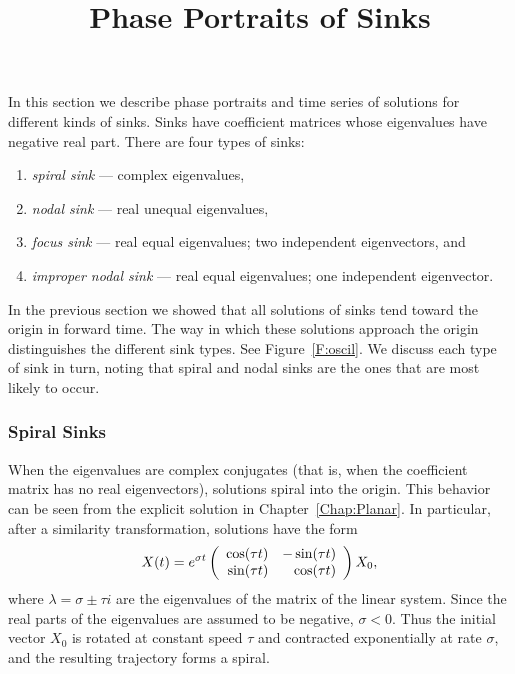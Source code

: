 \documentclass{ximera}
\title{Phase Portraits of Sinks}
\begin{document}
\begin{abstract}
\end{abstract}
\maketitle

  \label{S:PlanarSystems}

In this section we describe phase portraits and time series of
solutions for different kinds of sinks. Sinks have coefficient
matrices whose eigenvalues have negative real part.  There are
four types of sinks:
\begin{enumerate}
\item {\em spiral sink\/} --- complex eigenvalues,
\item {\em nodal sink\/} --- real unequal eigenvalues,
\item {\em focus sink\/} --- real equal eigenvalues; two independent
eigenvectors, and
\item {\em improper nodal sink\/} --- real equal eigenvalues; one independent
eigenvector.
\end{enumerate}
In the previous section we showed that all solutions of sinks tend toward
the origin in forward time.  The way in which these solutions approach the
origin distinguishes the different sink types.  See Figure~\ref{F:oscil}.
We discuss each type of sink in turn, noting that
spiral and nodal sinks are the ones that are most likely to occur.

\subsubsection*{Spiral Sinks}

When the eigenvalues are complex conjugates (that is, when the
coefficient matrix has no real eigenvectors), solutions
spiral into the origin.  This behavior can be seen from the
explicit solution  in Chapter~\ref{Chap:Planar}.
In particular, after a similarity transformation, solutions have the form
\[
X(t)  = e^{\sigma t}\left(\begin{array}{rr} \cos(\tau t) & -\sin(\tau t)\\ \sin(\tau t) &\cos(\tau t)\end{array}\right)X_0,
\]
where $\lambda=\sigma\pm\tau i$ are the eigenvalues of
the matrix of the linear system.  Since the real parts of
the eigenvalues are assumed to be negative, $\sigma<0$.  Thus
the initial vector $X_0$ is rotated at constant speed $\tau$
and contracted exponentially at rate $\sigma$, and the
resulting trajectory forms a spiral.
\end{document}
